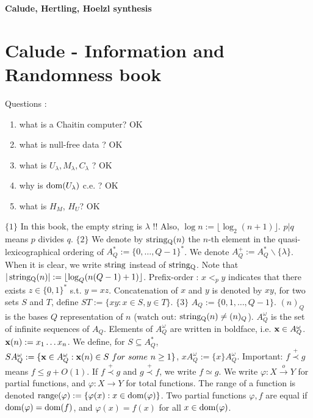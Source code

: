 \documentclass{article}
\begin{document}
\begin{center}
    \textbf{Calude, Hertling, Hoelzl synthesis}
\end{center}


\section{Calude - Information and Randomness book}

Questions :
\begin{enumerate}
    \item what is a Chaitin computer? OK
    \item what is null-free data ? OK
    \item what is $U_\lambda,M_\lambda,C_\lambda$ ? OK
    \item why is $\operatorname{dom} (U_\lambda)$ c.e. ? OK
    \item what is $H_M$, $H_U$? OK
\end{enumerate}

$\{1\}$ In this book, the empty string is $\lambda$ !! Also, $\log n := \lfloor \log_2 (n+1) \rfloor$. $p|q$ means $p$ divides $q$. $\{2\}$ We denote by $\stringQ{n}$ the $n$-th element in the quasi-lexicographical ordering of $A_Q^\ast := \{0,\ldots, Q-1\}^\ast$. We denote $A_Q^+ := A_Q^\ast\backslash \{\lambda\}$. When it is clear, we write $\stringnone{not}$ instead of $\stringQ{not}$. Note that $|\stringQ{n}| := \lfloor\log_Q(n(Q-1)+1) \rfloor$. Prefix-order : $x <_p y$ indicates that there exists $z \in \{0,1\}^\ast$ s.t. $y = xz$. Concatenation of $x$ and $y$ is denoted by $xy$, for two sets $S$ and $T$, define $ST := \{xy : x\in S,y \in T \}$. 
$\{3\}$ $A_Q := \{0,1,\ldots, Q-1\}$. $(n)_Q$ is the bases $Q$ representation of $n$ (watch out: $\stringQ{n} \neq (n)_Q$). $A_Q^\omega$ is the set of infinite sequences of $A_Q$. Elements of $A_Q^\omega$ are written in boldface, i.e. ${\bf x} \in A_Q^\omega$. ${\bf x}(n) := x_1 \ldots x_n$. We define, for $S \subseteq A_Q^\ast$, $S A_Q^\omega := \{ {\bf x} \in A_Q^\omega : {\bf x}(n) \in S \ for \ some \ n\geq 1\}$, $x A_Q^\omega := \{x\} A_Q^\omega$. Important: $f \overset{+}{\prec} g$ means $f \leq g + O(1)$. If $f \overset{+}{\prec} g$ and $g \overset{+}{\prec} f$, we write $f \simeq g$. We write $\varphi : X \overset{o}{\to} Y$ for partial functions, and $\varphi : X \to Y$ for total functions. The range of a function is denoted $\operatorname{range} (\varphi) := \{ \varphi(x): x \in \operatorname{dom} (\varphi) \}$. Two partial functions $\varphi,f$ are equal if $\operatorname{dom} (\varphi) = \operatorname{dom} (f)$, and $\varphi(x) = f(x)$ for all $x \in \operatorname{dom} (\varphi)$.
\end{document}
